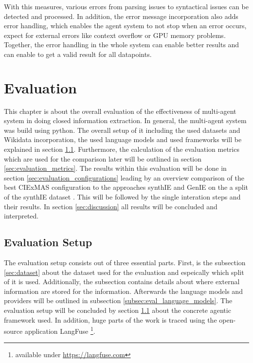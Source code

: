 \documentclass[a4paper,oneside,bibliography=totoc]{scrbook}
\begin{document}
With this measures, various errors from parsing issues to syntactical issues can be detected and processed. In addition, the error message incorporation also adds error handling, which enables the agent system to not stop when an error occurs, expect for external errors like context overflow or GPU memory problems. Together, the error handling in the whole system can enable better results and can enable to get a valid result for all datapoints.

\chapter{Evaluation}
\label{ch:evaluation}

This chapter is about the overall evaluation of the effectiveness of multi-agent system in doing closed information extraction. In general, the multi-agent system was build using python. The overall setup of it including the used datasets and Wikidata incorporation, the used language models and used frameworks will be explained in section \ref{sec:evaluation_setup}. Furthermore, the calculation of the evaluation metrics which are used for the comparison later will be outlined in section \ref{sec:evaluation_metrics}. The results within this evaluation will be done in section \ref{sec:evaluation_configurations} leading by an overview comparison of the best CIExMAS configuration to the approaches synthIE \cite{Josifoski2023} and GenIE \cite{Josifoski2021} on the a split of the synthIE dataset \cite{Josifoski2023}. This will be followed by the single interation steps and their results. In section \ref{sec:discussion} all results will be concluded and interpreted.

\section{Evaluation Setup}
\label{sec:evaluation_setup}

The evaluation setup consists out of three essential parts. First, is the subsection \ref{sec:dataset} about the dataset used for the evaluation and espeically which split of it is used. Additionally, the subsection contains details about where external information are stored for the information. Afterwards the language models and providers will be outlined in subsection \ref{subsec:eval_language_models}. The evaluation setup will be concluded by section \ref{sec:evaluation_setup} about the concrete agentic framework used. In addition, huge parts of the work is traced using the open-source application LangFuse \footnote{available under \url{https://langfuse.com}}.
\end{document}
